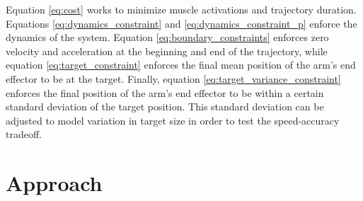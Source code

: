\documentclass[letterpaper, 10pt, conference]{ieeeconf}
\begin{document}
Equation \ref{eq:cost} works to minimize muscle activations and trajectory duration. Equations \ref{eq:dynamics_constraint} and \ref{eq:dynamics_constraint_p} enforce the dynamics of the system. Equation \ref{eq:boundary_constraints} enforces zero velocity and acceleration at the beginning and end of the trajectory, while equation \ref{eq:target_constraint} enforces the final mean position of the arm's end effector to be at the target. Finally, equation \ref{eq:target_variance_constraint} enforces the final position of the arm's end effector to be within a certain standard deviation of the target position. This standard deviation can be adjusted to model variation in target size in order to test the speed-accuracy tradeoff.




\section{Approach}
\end{document}
